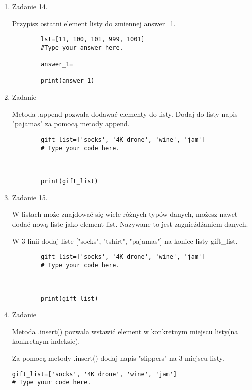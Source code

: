 \documentclass[11pt]{article}
\begin{document}
\begin{enumerate}
	\item 
	\begin{Large}
		Zadanie 14.
	\end{Large}
	\par
	Przypisz ostatni element listy do zmiennej answer\_1.
	\begin{lstlisting}
		lst=[11, 100, 101, 999, 1001]
		#Type your answer here.
		
		answer_1=
		
		print(answer_1)
	\end{lstlisting}

	\item
	\begin{Large}
		Zadanie
	\end{Large}
	\par
	Metoda .append pozwala dodawać elementy do listy.
	Dodaj do listy napis "pajamas" za pomocą metody append. 
	\begin{lstlisting}
		gift_list=['socks', '4K drone', 'wine', 'jam']
		# Type your code here.
		
		
		
		print(gift_list)
	\end{lstlisting}

	\item
	\begin{Large}
		Zadanie 15.
	\end{Large}
	\par
	W listach może znajdować się wiele różnych typów danych, możesz nawet dodać nową liste jako element list. Nazywane to jest zagnieżdżaniem danych.
	\par
	W 3 linii dodaj liste  ["socks", "tshirt", "pajamas"] na koniec listy gift\_list.
	\begin{lstlisting}
		gift_list=['socks', '4K drone', 'wine', 'jam']
		# Type your code here.
		
		
		
		print(gift_list)
	\end{lstlisting}

	\item
\begin{Large}
	Zadanie
\end{Large}
\par
Metoda .insert() pozwala wstawić element w konkretnym miejscu listy(na konkretnym indeksie).
\par
Za pomocą metody .insert() dodaj napis "slippers" na 3 miejscu listy.
\begin{lstlisting}
gift_list=['socks', '4K drone', 'wine', 'jam']
# Type your code here.




\end{lstlisting}
\end{enumerate}
\end{document}
